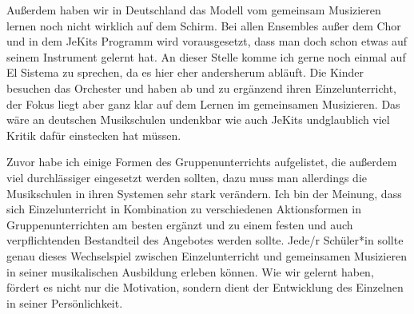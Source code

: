 Außerdem haben wir in Deutschland das Modell vom gemeinsam Musizieren lernen
noch nicht wirklich auf dem Schirm. Bei allen Ensembles außer dem Chor und in
dem JeKits Programm wird vorausgesetzt, dass man doch schon etwas auf seinem
Instrument gelernt hat. An dieser Stelle komme ich gerne noch einmal auf El
Sistema zu sprechen, da es hier eher andersherum abläuft. Die Kinder besuchen
das Orchester und haben ab und zu ergänzend ihren Einzelunterricht, der Fokus
liegt aber ganz klar auf dem Lernen im gemeinsamen Musizieren. Das wäre an
deutschen Musikschulen undenkbar wie auch JeKits undglaublich viel Kritik dafür
einstecken hat müssen.

Zuvor habe ich einige Formen des Gruppenunterrichts aufgelistet, die außerdem
viel durchlässiger eingesetzt werden sollten, dazu muss man allerdings die
Musikschulen in ihren Systemen sehr stark verändern. Ich bin der Meinung, dass
sich Einzelunterricht in Kombination zu verschiedenen Aktionsformen in
Gruppenunterrichten am besten ergänzt und zu einem festen und auch
verpflichtenden Bestandteil des Angebotes werden sollte. Jede/r Schüler*in
sollte genau dieses Wechselspiel zwischen Einzelunterricht und gemeinsamen
Musizieren in seiner musikalischen Ausbildung erleben können. Wie wir gelernt
haben, fördert es nicht nur die Motivation, sondern dient der Entwicklung des
Einzelnen in seiner Persönlichkeit.

